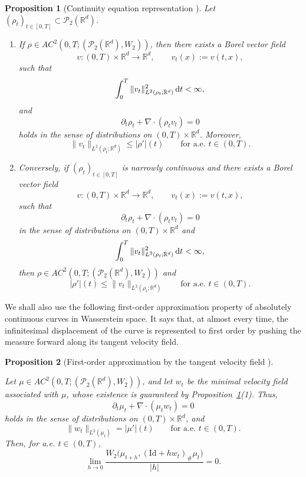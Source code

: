 \documentclass[11pt,reqno]{amsart}
\numberwithin{figure}{section}
\def\d {{\partial}}
\def\d{\mathrm{d}}
\renewcommand{\d}{  {\textup{d}} }
\newtheorem{proposition}{Proposition}[section]
\begin{document}
\begin{proposition}[Continuity equation representation {\cite[Theorem~8.3.1]{AGS2005}}] \label{prop:continuity-equation} 
Let $(\rho_t)_{t\in[0,T]}\subset\mathcal P_2(\mathbb R^d)$. \begin{enumerate} 
\item If $\rho\in AC^2(0,T;(\mathcal P_2(\mathbb R^d),W_2))$, then there exists a Borel vector field 
\[ v:(0,T)\times\mathbb R^d\to\mathbb R^d, \qquad v_t(x):=v(t,x), \] 
such that 
\[ \int_0^T \|v_t\|_{L^2(\rho_t;\mathbb R^d)}^2\,\d t<\infty, \] and 
\[ \partial_t\rho_t+\nabla\cdot(\rho_t v_t)=0 \] 
holds in the sense of distributions on $(0,T)\times\mathbb R^d$. Moreover, 
\[ \|v_t\|_{L^2(\rho_t;\mathbb R^d)} \le |\rho'|(t) \qquad\text{for a.e.\ }t\in(0,T). \] 
\item Conversely, if $(\rho_t)_{t\in[0,T]}$ is narrowly continuous and there exists a Borel vector field
\[ v:(0,T)\times\mathbb R^d\to\mathbb R^d, \qquad v_t(x):=v(t,x), \] 
such that 
\[ \partial_t\rho_t+\nabla\cdot(\rho_t v_t)=0 \] 
in the sense of distributions on $(0,T)\times\mathbb R^d$ and 
\[ \int_0^T \|v_t\|_{L^2(\rho_t;\mathbb R^d)}^2\,\d t<\infty, \] then $\rho\in AC^2(0,T;(\mathcal P_2(\mathbb R^d),W_2))$ and 
\[ |\rho'|(t)\le \|v_t\|_{L^2(\rho_t;\mathbb R^d)} \qquad\text{for a.e.\ }t\in(0,T). \] 
\end{enumerate} 
\end{proposition}

We shall also use the following first-order approximation property of
absolutely continuous curves in Wasserstein space. It says that, at almost
every time, the infinitesimal displacement of the curve is represented to
first order by pushing the measure forward along its tangent velocity field.

\begin{proposition}[First-order approximation by the tangent velocity field {\cite[Proposition~8.4.6]{AGS2005}}]
\label{prop:first-order-approximation}

Let $\mu\in AC^2(0,T;(\mathcal P_2(\mathbb R^d),W_2))$, and let $w_t$ be the minimal velocity field associated with $\mu$, whose existence is guaranteed by Proposition~\ref{prop:continuity-equation}(1). Thus,
\[
\partial_t\mu_t+\nabla\cdot(\mu_t w_t)=0
\]
holds in the sense of distributions on $(0,T)\times\mathbb R^d$, and
\[
\|w_t\|_{L^2(\mu_t)}=|\mu'|(t)
\qquad\text{for a.e. }t\in(0,T).
\]
Then, for a.e. $t\in(0,T)$,
\[
\lim_{h\to0}
\frac{
W_2\bigl(\mu_{t+h},(\mathrm{Id}+h w_t)_\#\mu_t\bigr)
}{|h|}
=0.
\]
\end{proposition}
\end{document}
